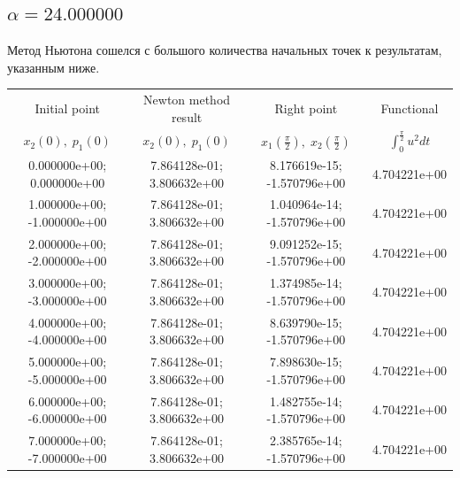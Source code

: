 \documentclass[titlepage]{article}
\def\l{\left}
\def\r{\right}
\begin{document}
\subsection{$\alpha = 24.000000$} 
Метод Ньютона сошелся с большого количества начальных точек к результатам, указанным ниже. \\ 
\begin{tabular}{ | c | c | c | c |} 
\hline 
Initial point  & Newton method result & Right point & Functional 
 \\ $x_2(0), \; p_1(0)$ & $x_2(0), \; p_1(0)$ & $x_1\l(\frac{\pi}{2}\r), \; x_2\l(\frac{\pi}{2}\r)$ & $\int_{0}^{\frac{\pi}{2}}u^2dt$  \\ \hline 
0.000000e+00; 0.000000e+00 & 7.864128e-01; 3.806632e+00 & 8.176619e-15; -1.570796e+00 & 4.704221e+00 \\ \hline 
1.000000e+00; -1.000000e+00 & 7.864128e-01; 3.806632e+00 & 1.040964e-14; -1.570796e+00 & 4.704221e+00 \\ \hline 
2.000000e+00; -2.000000e+00 & 7.864128e-01; 3.806632e+00 & 9.091252e-15; -1.570796e+00 & 4.704221e+00 \\ \hline 
3.000000e+00; -3.000000e+00 & 7.864128e-01; 3.806632e+00 & 1.374985e-14; -1.570796e+00 & 4.704221e+00 \\ \hline 
4.000000e+00; -4.000000e+00 & 7.864128e-01; 3.806632e+00 & 8.639790e-15; -1.570796e+00 & 4.704221e+00 \\ \hline 
5.000000e+00; -5.000000e+00 & 7.864128e-01; 3.806632e+00 & 7.898630e-15; -1.570796e+00 & 4.704221e+00 \\ \hline 
6.000000e+00; -6.000000e+00 & 7.864128e-01; 3.806632e+00 & 1.482755e-14; -1.570796e+00 & 4.704221e+00 \\ \hline 
7.000000e+00; -7.000000e+00 & 7.864128e-01; 3.806632e+00 & 2.385765e-14; -1.570796e+00 & 4.704221e+00 \\ \hline 
\end{tabular} 
\end{document}
